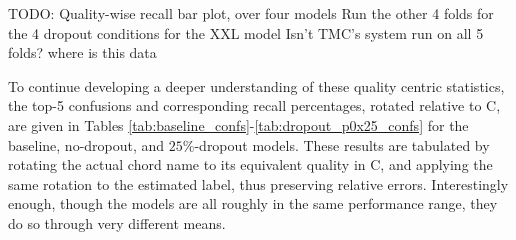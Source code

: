 TODO: Quality-wise recall bar plot, over four models
Run the other 4 folds for the 4 dropout conditions for the XXL model
Isn't TMC's system run on all 5 folds? where is this data


To continue developing a deeper understanding of these quality centric statistics, the top-5 confusions and corresponding recall percentages, rotated relative to C, are given in Tables \ref{tab:baseline_confs}-\ref{tab:dropout_p0x25_confs} for the baseline, no-dropout, and $25\%$-dropout models.
These results are tabulated by rotating the actual chord name to its equivalent quality in C, and applying the same rotation to the estimated label, thus preserving relative errors.
Interestingly enough, though the models are all roughly in the same performance range, they do so through very different means.


